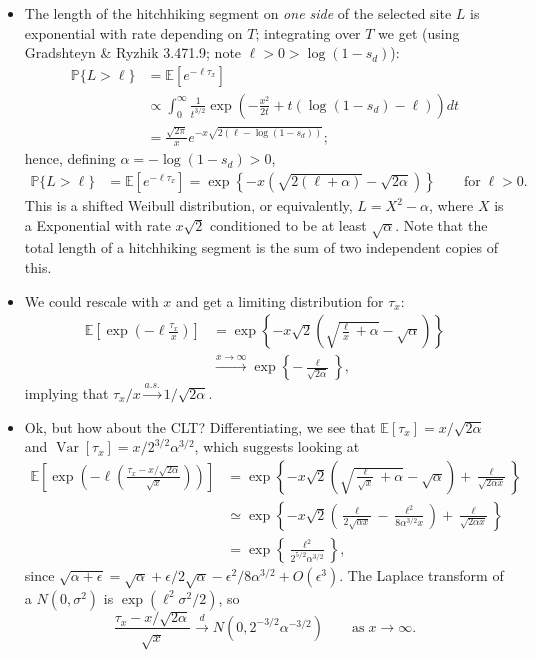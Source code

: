 \documentclass{article}
\newcommand{\E}{\mathbb{E}}
\renewcommand{\P}{\mathbb{P}}
\newcommand{\var}{\mathop{\mbox{Var}}}
\begin{document}
\begin{itemize}
\item The length of the hitchhiking segment on \emph{one side} of the selected site $L$ is exponential with rate depending on $T$;
integrating over $T$ we get
(using Gradshteyn \& Ryzhik 3.471.9; note $\ell > 0 > \log(1-s_d)$):
\begin{align*}
 \P\{ L > \ell \} &= \E\left[ e^{-\ell \tau_x} \right] \\
 & \propto \int_0^\infty \frac{1}{t^{3/2}} \exp\left(-\frac{x^2}{2t} + t(\log(1-s_d) -\ell) \right)  dt \\
 &= \frac{\sqrt{2\pi}}{x} e^{-x\sqrt{2(\ell-\log(1-s_d))}} ;
\end{align*}
hence, defining $\alpha = - \log(1-s_d) > 0$,
\begin{align*}
 \P\{ L > \ell \} &= \E\left[ e^{-\ell \tau_x} \right] = \exp\left\{{-x\left(\sqrt{2(\ell+\alpha)} - \sqrt{2\alpha}\right)}\right\} \qquad \mbox{for}\; \ell>0.
\end{align*}
This is a shifted Weibull distribution, or equivalently, $L=X^2-\alpha$, where $X$ is a Exponential with rate $x\sqrt{2}$ conditioned to be at least $\sqrt{\alpha}$.
Note that the total length of a hitchhiking segment is the sum of two independent copies of this.

\item We could rescale with $x$ and get a limiting distribution for $\tau_x$:
\begin{align*}
  \E\left[\exp\left( -\ell \frac{\tau_x}{x} \right)\right]
        &= \exp\left\{ - x\sqrt{2}\left(\sqrt{\frac{\ell}{x}+\alpha} - \sqrt{\alpha}\right) \right\} \\
        &\xrightarrow{x\to\infty} \exp\left\{ - \frac{\ell}{\sqrt{2\alpha}} \right\} ,
\end{align*}
implying that $\tau_x/x \xrightarrow{a.s.} 1/\sqrt{2\alpha}$.

\item Ok, but how about the CLT?  Differentiating, we see that $\E[\tau_x]=x/\sqrt{2\alpha}$ and $\var[\tau_x]=x/2^{3/2}\alpha^{3/2}$,
which suggests looking at
\begin{align*}
\E\left[\exp\left( -\ell \left(\frac{\tau_x-x/\sqrt{2\alpha}}{\sqrt{x}} \right) \right)\right]
    &= \exp\left\{ - x\sqrt{2}\left(\sqrt{\frac{\ell}{\sqrt{x}}+\alpha} - \sqrt{\alpha}\right) + \frac{\ell}{\sqrt{2\alpha x}} \right\} \\
    &\simeq \exp\left\{ - x\sqrt{2}\left( \frac{\ell}{2\sqrt{\alpha x}} - \frac{\ell^2}{8\alpha^{3/2}x}  \right) + \frac{\ell}{\sqrt{2\alpha x}} \right\} \\
    &= \exp\left\{ \frac{\ell^2}{2^{5/2}\alpha^{3/2}} \right\} ,
\end{align*}
since $\sqrt{\alpha+\epsilon}=\sqrt{\alpha} +\epsilon/2\sqrt{\alpha}-\epsilon^2/8\alpha^{3/2} + O(\epsilon^3)$.
The Laplace transform of a $N(0,\sigma^2)$ is $\exp(\ell^2\sigma^2/2)$, so
\[
\frac{\tau_x - x/\sqrt{2\alpha}}{\sqrt{x}} \xrightarrow{d} N(0,2^{-3/2}\alpha^{-3/2}) \qquad \mbox{as}\;x\to\infty.
\]


\end{itemize}
\end{document}
